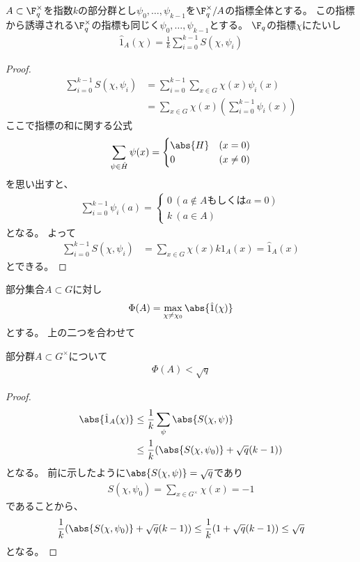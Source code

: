 \documentclass{jsarticle}
\begin{document}
\begin{prop}
$A\subset \F_q^\times$を指数$k$の部分群とし$\psi_0,\ldots,\psi_{k-1}$を$\F_q^\times/A$の指標全体とする。
この指標から誘導される$\F_q^\times$の指標も同じく$\psi_0,\ldots,\psi_{k-1}$とする。
$\F_q$の指標$\chi$にたいし
\begin{align*}
\hat{1}_A(\chi)=\frac{1}{k}\sum^{k-1}_{i=0}S(\chi,\psi_i)
\end{align*}
\end{prop}
\begin{proof}
\begin{align*}
\sum^{k-1}_{i=0}S(\chi,\psi_i)&=\sum^{k-1}_{i=0}\sum_{x\in G}\chi(x)\psi_i(x)\\
&=\sum_{x\in G}\chi(x)(\sum_{i=0}^{k-1}\psi_i(x))
\end{align*}
ここで指標の和に関する公式
\begin{align*}
\sum_{\psi\in\hat{H}}\psi(x)=\begin{cases}\abs{H}&(x=0)\\0&(x\neq0)\end{cases}
\end{align*}
を思い出すと、
\begin{align*}
\sum_{i=0}^{k-1}\psi_i(a)=\begin{cases}0~(a\not\in A\mbox{もしくは}a=0)\\k~(a\in A)\end{cases}
\end{align*}
となる。
よって
\begin{align*}
\sum^{k-1}_{i=0}S(\chi,\psi_i)&=\sum_{x\in G}\chi(x)k1_A(x)=\hat{1}_A(x)
\end{align*}
とできる。
\end{proof}

部分集合$A\subset G$に対し
\begin{align*}
\Phi(A) = \max_{\chi\neq\chi_0}\abs{\hat{1}(\chi)}
\end{align*}
とする。
上の二つを合わせて
\begin{thm}
部分群$A\subset G^\times$について
\begin{align*}
\Phi(A)<\sqrt{q}
\end{align*}
\end{thm}

\begin{proof}
\begin{align*}
\abs{\hat{1}_A(\chi)}&\leq\frac{1}{k}\sum_{\psi}\abs{S(\chi,\psi)}\\
&\leq\frac{1}{k}(\abs{S(\chi,\psi_0)}+\sqrt{q}(k-1))
\end{align*}
となる。
前に示したように$\abs{S(\chi,\psi)}=\sqrt{q}$であり
\begin{align*}
S(\chi,\psi_0)=\sum_{x\in G^\times}\chi(x)=-1
\end{align*}
であることから、
\begin{align*}
\frac{1}{k}(\abs{S(\chi,\psi_0)}+\sqrt{q}(k-1))\leq\frac{1}{k}(1+\sqrt{q}(k-1))\leq\sqrt{q}
\end{align*}
となる。
\end{proof}
\end{document}
